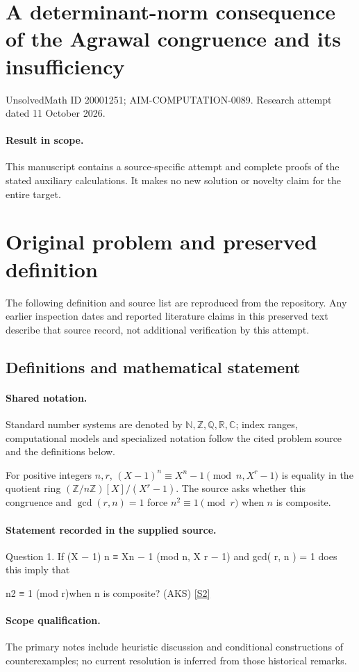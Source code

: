 \documentclass[11pt]{article}
\begin{document}
\section*{A determinant-norm consequence of the Agrawal congruence and its insufficiency}
\noindent UnsolvedMath ID 20001251; AIM-COMPUTATION-0089. Research attempt dated 11 October 2026.
\paragraph{Result in scope.}This manuscript contains a source-specific attempt and complete proofs of the stated auxiliary calculations. It makes no new solution or novelty claim for the entire target.
\section{Original problem and preserved definition}
The following definition and source list are reproduced from the repository. Any earlier inspection dates and reported literature claims in this preserved text describe that source record, not additional verification by this attempt.
\subsection{Definitions and mathematical statement}

\paragraph{Shared notation.}Standard number systems are denoted by $\mathbb N,\mathbb Z,\mathbb Q,\mathbb R,\mathbb C$; index ranges, computational models and specialized notation follow the cited problem source and the definitions below.


For positive integers $n,r$, $(X-1)^n\equiv X^n-1\pmod{n,X^r-1}$ is equality in the quotient ring $(\mathbb Z/n\mathbb Z)[X]/(X^r-1)$. The source asks whether this congruence and $\gcd(r,n)=1$ force $n^2\equiv1\pmod r$ when $n$ is composite.
\paragraph{Statement recorded in the supplied source.}
Question 1. If (X − 1) n ≡ Xn − 1 (mod n, X r − 1) and gcd( r, n ) = 1 does this imply that

n2 ≡ 1 (mod r)when n is composite? (AKS) \href{https://aimath.org/WWN/primesinp/primesinp.pdf}{[S2]}
\paragraph{Scope qualification.}
The primary notes include heuristic discussion and conditional constructions of counterexamples; no current resolution is inferred from those historical remarks.
\end{document}
